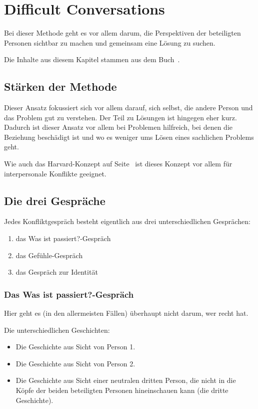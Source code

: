 \section{Difficult Conversations}
\label{difficult-conversations}

Bei dieser Methode geht es vor allem darum, die Perspektiven der beteiligten Personen sichtbar zu machen und gemeinsam eine Lösung zu suchen.

Die Inhalte aus diesem Kapitel stammen aus dem Buch~\cite{difficult-conversations}.

\subsection{Stärken der Methode}

Dieser Ansatz fokussiert sich vor allem darauf, sich selbst, die andere Person und das Problem gut zu verstehen. Der Teil zu Lösungen ist hingegen eher kurz. Dadurch ist dieser Ansatz vor allem bei Problemen hilfreich, bei denen die Beziehung beschädigt ist und wo es weniger ums Lösen eines sachlichen Problems geht.

Wie auch das Harvard-Konzept auf Seite~\pageref{harvard-konzept} ist dieses Konzept vor allem für interpersonale Konflikte geeignet.

\subsection{Die drei Gespräche}

Jedes Konfliktgespräch besteht eigentlich aus drei unterschiedlichen Gesprächen:

\begin{enumerate}
    \item das \glqq Was ist passiert?\grqq-Gespräch
    \item das Gefühle-Gespräch
    \item das Gespräch zur Identität
\end{enumerate}

\subsubsection{Das \glqq Was ist passiert?\grqq-Gespräch}

Hier geht es (in den allermeisten Fällen) überhaupt nicht darum, wer \glqq recht hat\grqq.

Die unterschiedlichen Geschichten:

\begin{itemize}
    \item Die Geschichte aus Sicht von Person 1.
    \item Die Geschichte aus Sicht von Person 2.
    \item Die Geschichte aus Sicht einer neutralen dritten Person, die nicht in die Köpfe der beiden beteiligten Personen hineinschauen kann (\glqq die dritte Geschichte\grqq).
\end{itemize}

